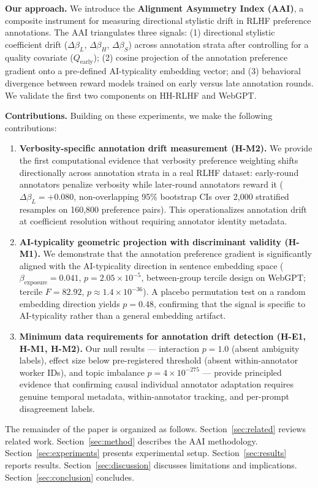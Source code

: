 \textbf{Our approach.} We introduce the \textbf{Alignment Asymmetry Index (AAI)}, a composite instrument for measuring directional stylistic drift in RLHF preference annotations. The AAI triangulates three signals: (1) directional stylistic coefficient drift ($\Delta\beta_L$, $\Delta\beta_H$, $\Delta\beta_S$) across annotation strata after controlling for a quality covariate ($Q_\text{early}$); (2) cosine projection of the annotation preference gradient onto a pre-defined AI-typicality embedding vector; and (3) behavioral divergence between reward models trained on early versus late annotation rounds. We validate the first two components on HH-RLHF and WebGPT.

\textbf{Contributions.} Building on these experiments, we make the following contributions:

\begin{enumerate}
\item \textbf{Verbosity-specific annotation drift measurement (H-M2).} We provide the first computational evidence that verbosity preference weighting shifts directionally across annotation strata in a real RLHF dataset: early-round annotators penalize verbosity while later-round annotators reward it ($\Delta\beta_L = +0.080$, non-overlapping 95\% bootstrap CIs over 2,000 stratified resamples on 160,800 preference pairs). This operationalizes annotation drift at coefficient resolution without requiring annotator identity metadata.

\item \textbf{AI-typicality geometric projection with discriminant validity (H-M1).} We demonstrate that the annotation preference gradient is significantly aligned with the AI-typicality direction in sentence embedding space ($\beta_\text{exposure} = 0.041$, $p = 2.05\times10^{-5}$, between-group tercile design on WebGPT; tercile $F = 82.92$, $p \approx 1.4\times10^{-36}$). A placebo permutation test on a random embedding direction yields $p = 0.48$, confirming that the signal is specific to AI-typicality rather than a general embedding artifact.

\item \textbf{Minimum data requirements for annotation drift detection (H-E1, H-M1, H-M2).} Our null results --- interaction $p = 1.0$ (absent ambiguity labels), effect size below pre-registered threshold (absent within-annotator worker IDs), and topic imbalance $p = 4\times10^{-275}$ --- provide principled evidence that confirming causal individual annotator adaptation requires genuine temporal metadata, within-annotator tracking, and per-prompt disagreement labels.
\end{enumerate}

The remainder of the paper is organized as follows. Section~\ref{sec:related} reviews related work. Section~\ref{sec:method} describes the AAI methodology. Section~\ref{sec:experiments} presents experimental setup. Section~\ref{sec:results} reports results. Section~\ref{sec:discussion} discusses limitations and implications. Section~\ref{sec:conclusion} concludes.
